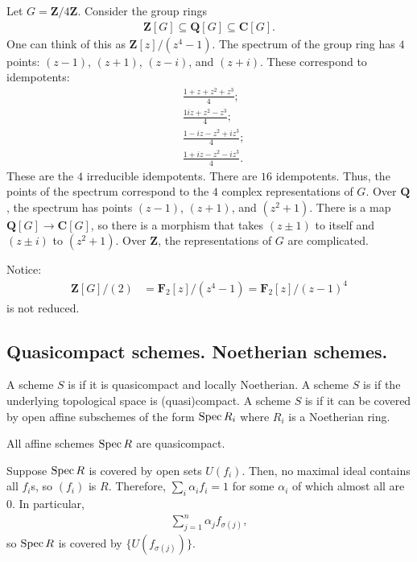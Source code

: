 \documentclass [11 pt, oneside] {article}
\begin{document}
\begin{example}[ ]\label{}\text{}
Let $G=\mathbf{Z}/4\mathbf{Z}$. Consider the group rings
\begin{align*}
	\mathbf{Z}[G] \subseteq \mathbf{Q}[G] \subseteq \mathbf{C}[G].
\end{align*}
One can think of this as $\mathbf{Z}[z]/(z^4-1)$. The spectrum of the group ring has $4$ points: $(z-1)$, $(z+1)$, $(z-i)$, and $(z+i)$. These correspond to idempotents:
\begin{align*}
	&\frac{1+z+z^2+z^3}{4};\\
	&\frac{1iz+z^2-z^3}{4};\\
	&\frac{1 -iz-z^2 + iz^3}{4};\\
	&\frac{1+iz-z^2-iz^3}{4}.
\end{align*}
These are the $4$ irreducible idempotents. There are $16$ idempotents. 
Thus, the points of the spectrum correspond to the $4$ complex representations of $G$. Over $\mathbf{Q}$, the spectrum has points $(z-1)$, $(z+1)$, and $(z^2+1)$. There is a map $\mathbf{Q}[G] \longrightarrow \mathbf{C}[G]$, so there is a morphism that takes $(z\pm1)$ to itself and $(z\pm i)$ to $(z^2+1)$. Over $\mathbf{Z}$, the representations of $G$ are complicated.
\end{example}

\begin{remark}
	Notice:
	\begin{align*}
		\mathbf{Z}[G] / (2) &=  \mathbf{F}_{2}[z]/(z^4-1) =  \mathbf{F}_{2}[z] /(z-1)^4
	\end{align*}
	is not reduced.
\end{remark}

\subsection{Quasicompact schemes. Noetherian schemes.}
A scheme $S$ is  if it is quasicompact and locally Noetherian. A scheme $S$ is  if the underlying topological space is (quasi)compact. A scheme $S$ is  if it can be covered by open affine subschemes of the form $\operatorname{Spec} R_i$ where $R_i$ is a Noetherian ring.

\begin{remark}
	All affine schemes $\operatorname{Spec} R$ are quasicompact.
\end{remark}

Suppose $\operatorname{Spec} R$ is covered by open sets $U({f_i})$. Then, no maximal ideal contains all $f_i$s, so $(f_i)$ is $R$. Therefore, $\sum_{i}^{} \alpha_if_i=1$ for some $\alpha_i$ of which almost all are $0$. In particular,
\begin{align*}
	\sum_{j=1}^{n} \alpha_{j}f_{\sigma(j) },
\end{align*}
so $\operatorname{Spec} R$ is covered by $\{U({f_{\sigma(j)}})\}$.
\end{document}
